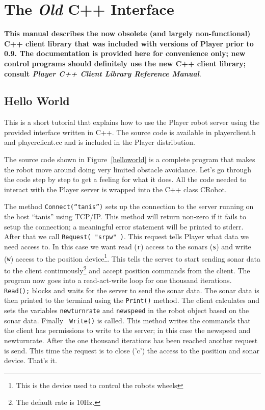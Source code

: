 \documentclass[11pt]{article}
\begin{document}
\newpage
\tableofcontents
\newpage

\setcounter{page}{0}
\section{The {\em Old} C++ Interface}
\label{app:oldc++}
{\Large \bf This manual describes the now obsolete (and largely non-functional)
C++ client library that was included with versions of Player prior to 0.9.
The documentation is provided here for convenience only; new control programs
should definitely use the new C++ client library; consult {\em Player C++
Client Library Reference Manual}}.

\subsection{Hello World}

This is a short tutorial that explains how to use the Player robot
 server using the provided interface written in C++. The source
 code is available in playerclient.h and playerclient.cc and is 
included in the Player distribution.

The source code shown in Figure~\ref{helloworld} is a complete
program that makes the robot move around doing very limited obstacle 
avoidance.
Let's go through the code step by step to get a feeling for what
it does. All the code needed to interact with the Player server is
wrapped into the C++ class CRobot. 

The method {\tt Connect(``tanis'')} sets up the connection to the server
running on the host ``tanis'' using TCP/IP. This method will
return non-zero if it fails to setup the connection; a meaningful
error statement will be printed to stderr.
After that we call {\tt Request( "srpw" )}.
This request tells Player what data we need access to. In this
case we want read ({\tt r}) access to the sonars ({\tt s}) and write ({\tt w})
access to the position device\footnote{This is the device used to 
control the robots wheels}. This tells the server to start sending
sonar data to the client continuously\footnote{The default rate is 
10Hz.} and accept position commands from the client. The program now
goes into a read-act-write loop for one thousand iterations. {\tt 
Read();} blocks and waits for the server to send
the sonar data.
The sonar data is then printed to the terminal using the {\tt Print()}
method. The client calculates and sets the variables {\tt newturnrate} and
{\tt newspeed} in the robot object based on the sonar data. Finally {\tt 
Write()} is called. This method writes the commands that the client has 
permissions to write to the server; in this case the newspeed and 
newturnrate. After the one thousand iterations has been reached another
request is send. This time the request is to close ('c') the access to
the position and sonar device. That's it.
\end{document}
